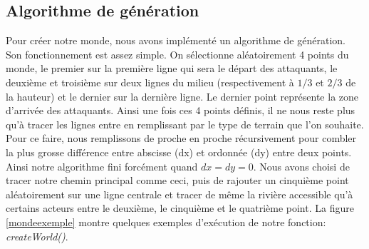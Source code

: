 \documentclass{article}
\begin{document}
\subsection{Algorithme de génération}
Pour créer notre monde, nous avons implémenté un algorithme de génération. Son fonctionnement est assez simple. On sélectionne aléatoirement 4 points du monde, le premier sur la première ligne qui sera le départ des attaquants, le deuxième et troisième sur deux lignes du milieu (respectivement à $1/3$ et $2/3$ de la hauteur) et le dernier sur la dernière ligne. Le dernier point représente la zone d'arrivée des attaquants. Ainsi une fois ces 4 points définis, il ne nous reste plus qu'à tracer les lignes entre en remplissant par le type de terrain que l'on souhaite. Pour ce faire, nous remplissons de proche en proche récursivement pour combler la plus grosse différence entre abscisse (dx) et ordonnée (dy) entre deux points. Ainsi notre algorithme fini forcément quand $dx=dy=0$. Nous avons choisi de tracer notre chemin principal comme ceci, puis de rajouter un cinquième point aléatoirement sur une ligne centrale et tracer de même la rivière accessible qu'à certains acteurs entre le deuxième, le cinquième et le quatrième point. La figure \ref{mondeexemple} montre quelques exemples d'exécution de notre fonction:
\textit{createWorld()}. 
\vspace{1cm}
\end{document}
